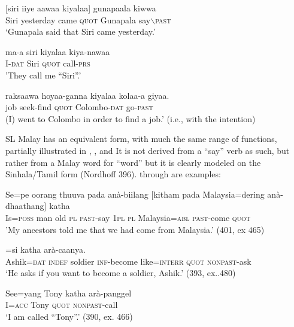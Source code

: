 \ea\label{ex3.5.1} 
\gll  
{}[siri  iiye  aawaa  kiyalaa]  gunapaala kiwwa\\
   Siri yesterday came  \textsc{quot}  Gunapala  say{$\backslash$}\textsc{past} \\
   `Gunapala said that Siri came yesterday.'
\z




\ea\label{ex3.5.2} 
\gll  ma-{\dott}a siri kiyalaa kiya-nawaa\\
I-\textsc{dat} Siri \textsc{quot} call-\textsc{prs} \\
'They call me ``Siri''.'
\z




\ea\label{ex3.5.3} 
\gll raksaawa hoyaa-ganna kiyalaa kola{\umb}a-{\dott}a giyaa.\\
  job  seek-find  \textsc{quot} Colombo-\textsc{dat} go-\textsc{past} \\
  (I) went to Colombo in order to find a job.' (i.e., with the  intention)
\z
 
SL Malay has an equivalent form, with much the same range of functions, partially illustrated in , , and  It is not derived from a ``say'' verb as such, but rather from a Malay word for ``word'' but it is clearly modeled on the Sinhala/Tamil form  (Nordhoff 396).  through  are examples:



\ea\label{ex3.5.4} 
\gll  Se=pe oorang thuuva pada anà-biilang [kitham pada   Malaysia=dering anà-dhaathang] katha\\
Is=\textsc{poss} man old \textsc{pl} \textsc{past}-say  1\textsc{pl}    \textsc{pl} Malaysia=\textsc{abl} \textsc{past}-come \textsc{quot}  \\
'My ancestors told me that we had come from Malaysia.' (401, ex 465)
\z


 


\ea\label{ex3.5.5} 
\gll  [Aashik=nang hathu soldier mà-jaadi suuka]=si katha  arà-caanya. \\
 Ashik=\textsc{dat} \textsc{indef} soldier \textsc{inf}-become like=\textsc{interr} \textsc{quot} \textsc{nonpast}-ask\\
 `He asks if you want to become a soldier, Ashik.' (393, ex..480)
\z




\ea\label{ex3.5.6} 
\gll   See=yang  Tony katha arà-panggel\\
 I=\textsc{acc}  Tony   \textsc{quot}  \textsc{nonpast}-call\\
 `I am called ``Tony''.'  (390, ex. 466)
\z


